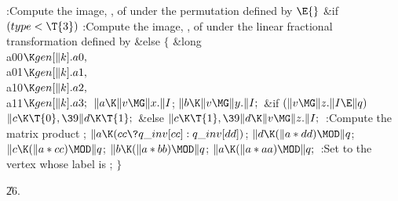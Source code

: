 \Y\B\4:Compute the image, , of  under the permutation
defined by \X${}\E{}$\6
\&{if} ${}(\\{type}<\T{3}){}$\1\5
:Compute the image, , of  under the linear fractional
transformation defined by \X\2\6
\&{else}\5
${}\{{}$\5
\1\&{long} \\{a00}${}\K\\{gen}[\|k].\\{a0},{}$ \\{a01}${}\K\\{gen}[\|k].%
\\{a1},{}$ \\{a10}${}\K\\{gen}[\|k].\\{a2},{}$ \\{a11}${}\K\\{gen}[\|k].%
\\{a3};{}$\7
${}\|a\K\|v\MG\|x.\|I{}$;\5
${}\|b\K\|v\MG\|y.\|I;{}$\6
\&{if} ${}(\|v\MG\|z.\|I\E\|q){}$\1\5
${}\|c\K\T{0},\39\|d\K\T{1};{}$\2\6
\&{else}\1\5
${}\|c\K\T{1},\39\|d\K\|v\MG\|z.\|I;{}$\2\6
:Compute the matrix product \X;\6
${}\|a\K(\\{cc}\?\\{q\_inv}[\\{cc}]:\\{q\_inv}[\\{dd}]){}$;\6
${}\|d\K(\|a*\\{dd})\MOD\|q{}$;\5
${}\|c\K(\|a*\\{cc})\MOD\|q{}$;\5
${}\|b\K(\|a*\\{bb})\MOD\|q{}$;\5
${}\|a\K(\|a*\\{aa})\MOD\|q;{}$\6
:Set  to the vertex whose label is %
\X;\6
\4${}\}{}$\2\par
\U26.\fi

